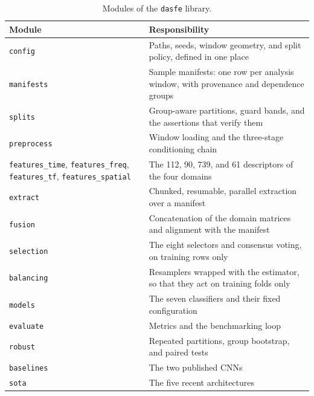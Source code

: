 \begin{table}[!htbp]
	\centering
	\caption{Modules of the \texttt{dasfe} library.}
	\label{tab:modules}
	\small
	\setlength{\tabcolsep}{4pt}
	\renewcommand{\arraystretch}{1.1}
	\begin{tabularx}{\textwidth}{@{}>{\raggedright\arraybackslash}p{3.6cm} >{\raggedright\arraybackslash}X@{}}
		\toprule
		\textbf{Module} & \textbf{Responsibility}\\
		\midrule
		\texttt{config}     & Paths, seeds, window geometry, and split policy, defined in one place\\
		\texttt{manifests}  & Sample manifests: one row per analysis window, with provenance and dependence groups\\
		\texttt{splits}     & Group-aware partitions, guard bands, and the assertions that verify them\\
		\texttt{preprocess} & Window loading and the three-stage conditioning chain\\
		\texttt{features\_time}, \texttt{features\_freq}, \texttt{features\_tf}, \texttt{features\_spatial} & The 112, 90, 739, and 61 descriptors of the four domains\\
		\texttt{extract}    & Chunked, resumable, parallel extraction over a manifest\\
		\texttt{fusion}     & Concatenation of the domain matrices and alignment with the manifest\\
		\texttt{selection}  & The eight selectors and consensus voting, on training rows only\\
		\texttt{balancing}  & Resamplers wrapped with the estimator, so that they act on training folds only\\
		\texttt{models}     & The seven classifiers and their fixed configuration\\
		\texttt{evaluate}   & Metrics and the benchmarking loop\\
		\texttt{robust}     & Repeated partitions, group bootstrap, and paired tests\\
		\texttt{baselines}  & The two published CNNs\\
		\texttt{sota}       & The five recent architectures\\
		\bottomrule
	\end{tabularx}
\end{table}

